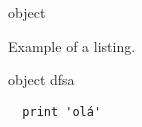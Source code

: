 \begin{listing}[H]
\begin{scalacode}
  object
\end{scalacode}

\caption{Example of a listing.}
\label{lst:example}
\end{listing}

\begin{scalacode}
  object dfsa {
  }
\end{scalacode}

\begin{verbatim}
  print 'olá'
\end{verbatim}

